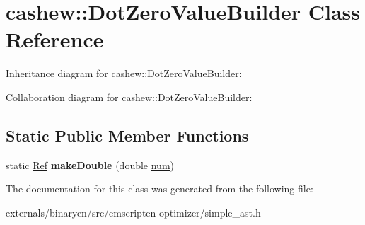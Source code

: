 \hypertarget{classcashew_1_1_dot_zero_value_builder}{}\section{cashew\+:\+:Dot\+Zero\+Value\+Builder Class Reference}
\label{classcashew_1_1_dot_zero_value_builder}


Inheritance diagram for cashew\+:\+:Dot\+Zero\+Value\+Builder\+:


Collaboration diagram for cashew\+:\+:Dot\+Zero\+Value\+Builder\+:
\subsection*{Static Public Member Functions}
\begin{DoxyCompactItemize}
\item 
\mbox{\label{classcashew_1_1_dot_zero_value_builder_ad586fc795d148fbdf5e7289ad99cbe47}} 
static \mbox{\hyperlink{structcashew_1_1_ref}{Ref}} {\bfseries make\+Double} (double \mbox{\hyperlink{structnum}{num}})
\end{DoxyCompactItemize}


The documentation for this class was generated from the following file\+:\begin{DoxyCompactItemize}
\item 
externals/binaryen/src/emscripten-\/optimizer/simple\+\_\+ast.\+h\end{DoxyCompactItemize}
